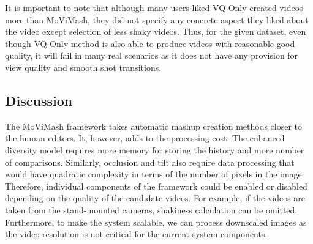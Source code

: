\documentclass{sig-alternate}
\begin{document}
It is important to note that although many users liked VQ-Only
created videos more than MoViMash, they did not specify any concrete aspect they liked about the video except selection of less shaky videos. Thus, for the given dataset, even though VQ-Only method is also able to produce videos with reasonable good quality, it will fail in many real scenarios as it does not have any provision for view quality and smooth shot transitions.

\subsection{Discussion}
The MoViMash framework takes automatic mashup creation methods
closer to the human editors. It, however, adds to the processing
cost. The enhanced diversity model requires more memory for storing the history and more number of comparisons. Similarly, occlusion and tilt also require data processing that would have quadratic complexity in terms of the number of pixels in the image. Therefore, individual components of the framework could be enabled or disabled depending on the quality of the candidate videos. For example, if the videos are taken from the stand-mounted cameras, shakiness calculation can be omitted. Furthermore, to make the system scalable, we can process downscaled images as the video resolution is not critical for the current system components.
\end{document}
